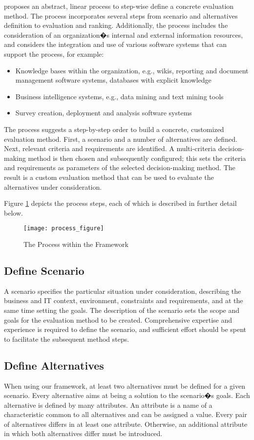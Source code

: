 \documentclass[journal,final,a4paper,twoside]{IEEEtran}
\begin{document}
 proposes an abstract, linear process to step-wise define a concrete evaluation method. The process incorporates several steps from scenario and alternatives definition to evaluation and ranking. Additionally, the process includes the consideration of an organization�s internal and external information resources, and considers the integration and use of various software systems that can support the process, for example: 
\begin{itemize}
\item Knowledge bases within the organization, e.g., wikis, reporting and document management software systems, databases with explicit knowledge
\item Business intelligence systems, e.g., data mining and text mining tools
\item Survey creation, deployment and analysis software systems
\end{itemize}
The process suggests a step-by-step order to build a concrete, customized evaluation method. First, a scenario and a number of alternatives are defined. Next, relevant criteria and requirements are identified. A multi-criteria decision-making method is then chosen and subsequently configured; this sets the criteria and requirements as parameters of the selected decision-making method. The result is a custom evaluation method that can be used to evaluate the alternatives under consideration.

Figure \ref{fig1} depicts the process steps, each of which is described in further detail below.  

\begin{figure}[!t]
\centering
\texttt{[image: process\_figure]}
\caption{The Process within the  Framework}
\label{fig1}
\end{figure}

\subsection{Define Scenario}
A scenario specifies the particular situation under consideration, describing the business and IT context, environment, constraints and requirements, and at the same time setting the goals. The description of the scenario sets the scope and goals for the evaluation method to be created. Comprehensive expertise and experience is required to define the scenario, and sufficient effort should be spent to facilitate the subsequent method steps.


\subsection{Define Alternatives}
When using our framework, at least two alternatives must be defined for a given scenario. Every alternative aims at being a solution to the scenario�s goals. Each alternative is defined by many attributes. An attribute is a name of a characteristic common to all alternatives and can be assigned a value. Every pair of alternatives differs in at least one attribute. Otherwise, an additional attribute in which both alternatives differ must be introduced. 
\end{document}
